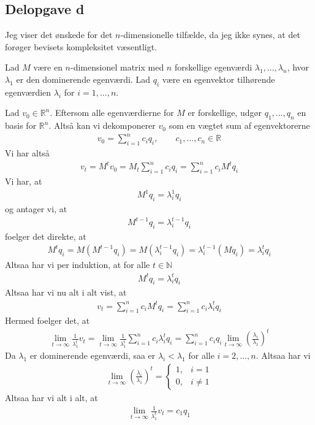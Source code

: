 \documentclass[12pt]{article}
\begin{document}
\subsection{Delopgave d}

Jeg viser det ønskede for det $n$-dimensionelle tilfælde, da jeg ikke synes, at det forøger bevisets kompleksitet væsentligt.

Lad $M$ være en $n$-dimensionel matrix med $n$ forskellige egenværdi $\lambda_1, ..., \lambda_n$, hvor $\lambda_1$ er den dominerende egenværdi. Lad $q_i$ være en egenvektor tilhørende egenværdien $\lambda_i$ for $i=1,...,n$. 

Lad $v_0\in\mathbb{R}^n$. Eftersom alle egenværdierne for $M$ er forskellige, udgør $q_1,...,q_n$ en basis for $\mathbb{R}^n$. Altså kan vi dekomponerer $v_0$ som en vægtet sum af egenvektorerne
\begin{align}
v_0 = \sum_{i=1}^n c_iq_i,\qquad c_1,...,c_n\in \mathbb{R}
\end{align}
Vi har altså
\begin{align}
v_t = M^tv_0 = M_t\sum_{i=1}^n c_iq_i = \sum_{i=1}^n c_iM^tq_i 
\end{align}
Vi har, at 
\begin{align}
M^1q_i = \lambda_i^1 q_i 
\end{align}
og antager vi, at
\begin{align}
M^{t-1}q_i= \lambda_i^{t-1}q_i
\end{align}
foelger det direkte, at 
\begin{align}
M^tq_i = M(M^{t-1}q_i)= M(\lambda_i^{t-1}q_i) = \lambda_i^{t-1}(Mq_i) = \lambda_i^tq_i
\end{align}
Altsaa har vi per induktion, at for alle $t\in\mathbb{N}$
\begin{align}
M^tq_i= \lambda_i^tq_i
\end{align}
Altsaa har vi nu alt i alt vist, at 
\begin{align}
v_t = \sum_{i=1}^n c_iM^tq_i = \sum_{i=1}^n c_i\lambda_i^tq_i
\end{align}
Hermed foelger det, at
\begin{align}
\lim_{t\to \infty} \frac{1}{\lambda_1^t}v_t = \lim_{t\to \infty} \frac{1}{\lambda_1^t} \sum_{i=1}^n c_i\lambda_i^tq_i = \sum_{i=1}^n c_i q_i \lim_{t\to \infty} \left( \frac{\lambda_i}{\lambda_1} \right)^t
\end{align}
Da $\lambda_1$ er dominerende egenværdi, saa er $\lambda_i<\lambda_1$ for alle $i=2,...,n$. Altsaa har vi
\begin{align}
\lim_{t\to \infty} \left( \frac{\lambda_i}{\lambda_1} \right)^t = \begin{cases}
1, & i=1 \\
0, & i\neq 1 
\end{cases}
\end{align}
Altsaa har vi alt i alt, at
\begin{align}
\lim_{t\to \infty} \frac{1}{\lambda_1^t}v_t = c_1q_1
\end{align}
\end{document}
